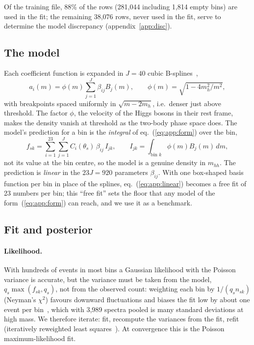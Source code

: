 Of the training file, 88\% of the rows (281,044 including 1,814 empty bins) are used in the fit;
the remaining 38,076 rows, never used in the fit, serve to determine the model discrepancy
(appendix~\ref{app:disc}).

\subsection{The model}
\label{app:smooth}

Each coefficient function is expanded in $J = 40$ cubic B-splines~\cite{deBoor:1978},
\begin{equation}
  a_i(m) = \phi(m)\sum_{j=1}^{J}\beta_{ij}B_j(m), \qquad \phi(m) = \sqrt{1 - 4m_h^2/m^2},
  \label{eq:app:spline}
\end{equation}
with breakpoints spaced uniformly in $\sqrt{m - 2m_h}$, i.e.\ denser just above threshold. The
factor $\phi$, the velocity of the Higgs bosons in their rest frame, makes the density vanish at
threshold as the two-body phase space does. The model's prediction for a bin is the
\emph{integral} of eq.~(\ref{eq:app:form}) over the bin,
\begin{equation}
  f_{sk} = \sum_{i=1}^{23}\sum_{j=1}^{J} C_i(\theta_s)\,\beta_{ij}\,I_{jk}, \qquad
  I_{jk} = \int_{\text{bin }k}\phi(m)B_j(m)\,dm ,
  \label{eq:app:linear}
\end{equation}
not its value at the bin centre, so the model is a genuine density in $m_{hh}$. The prediction is
\emph{linear} in the $23J = 920$ parameters $\beta_{ij}$. With one box-shaped basis function per
bin in place of the splines, eq.~(\ref{eq:app:linear}) becomes a free fit of 23 numbers per bin;
this ``free fit'' sets the floor that any model of the form~(\ref{eq:app:form}) can reach, and we
use it as a benchmark.

\subsection{Fit and posterior}
\label{app:fit}

\paragraph{Likelihood.} With hundreds of events in most bins a Gaussian likelihood with the Poisson
variance is accurate, but the variance must be taken from the model, $q_s\max(f_{sk}, q_s)$, not from
the observed count: weighting each bin by $1/(q_s n_{sk})$ (Neyman's $\chi^2$) favours downward
fluctuations and biases the fit low by about one event per bin~\cite{Baker:1983jz}, which with
3,989 spectra pooled is many standard deviations at high mass. We therefore iterate: fit, recompute
the variances from the fit, refit (iteratively reweighted least squares~\cite{Green:1984}). At
convergence this is the Poisson maximum-likelihood fit.

